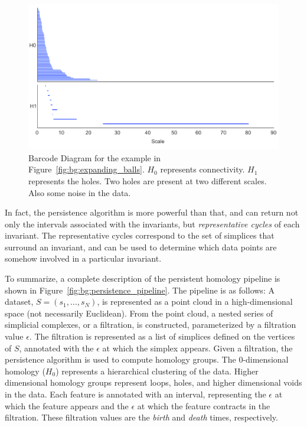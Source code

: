 \begin{figure}
\centering
\includegraphics[width=.75\textwidth]{fig/background/expanding_balls_barcode.pdf}
\caption[Barcode Diagram for the Two Circles Example]{Barcode Diagram for the example in Figure~\ref{fig:bg:expanding_balls}. $H_0$ represents connectivity. $H_1$ represents the holes. Two holes are present at two different scales. Also some noise in the data.}
\label{fig:bg:expanding_balls_barcode}
\end{figure}

In fact, the persistence algorithm is more powerful than that, and can return not only the intervals associated with the invariants, but \emph{representative cycles} of each invariant.
The representative cycles correspond to the set of simplices that surround an invariant, and can be used to determine which data points are somehow involved in a particular invariant.

To summarize, a complete description of the persistent homology pipeline is shown in Figure~\ref{fig:bg:persistence_pipeline}.
The pipeline is as follows:
A dataset, $S=(s_{1},\ldots,s_{N})$, is represented as a point cloud in a high-dimensional space (not necessarily Euclidean).
From the point cloud, a nested series of simplicial complexes, or a filtration, is constructed, parameterized by a filtration value $\epsilon$.
The filtration is represented as a list of simplices defined on the vertices of $S$, annotated with the $\epsilon$ at which the simplex appears.
Given a filtration, the persistence algorithm is used to compute homology groups.
The $0$-dimensional homology ($H_0$) represents a hierarchical clustering of the data.
Higher dimensional homology groups represent loops, holes, and higher dimensional voids in the data.
Each feature is annotated with an interval, representing the $\epsilon$ at which the feature appears and the $\epsilon$ at which the feature contracts in the filtration.
These filtration values are the \emph{birth} and \emph{death} times, respectively.

